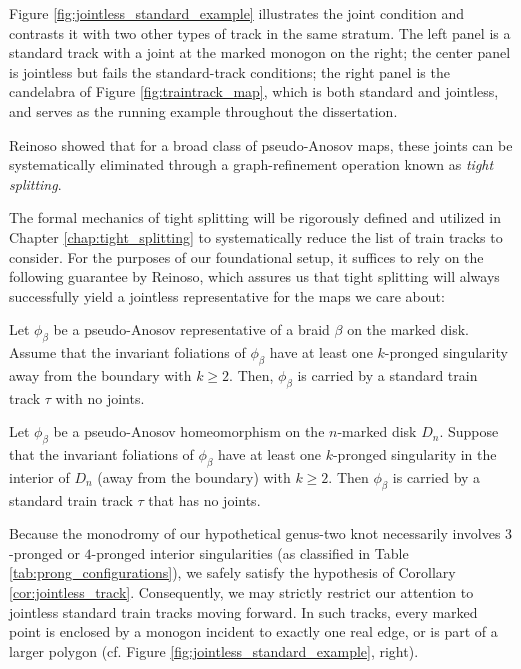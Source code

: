 Figure \ref{fig:jointless_standard_example} illustrates the joint condition and contrasts it with two other types of track in the same stratum. The left panel is a standard track with a joint at the marked monogon on the right; the center panel is jointless but fails the standard-track conditions; the right panel is the candelabra of Figure \ref{fig:traintrack_map}, which is both standard and jointless, and serves as the running example throughout the dissertation.

Reinoso \cite{reinoso2024pseudo} showed that for a broad class of pseudo-Anosov maps, these joints can be systematically eliminated through a graph-refinement operation known as \textit{tight splitting}.

The formal mechanics of tight splitting will be rigorously defined and utilized in Chapter \ref{chap:tight_splitting} to systematically reduce the list of train tracks to consider. For the purposes of our foundational setup, it suffices to rely on the following guarantee by Reinoso, which assures us that tight splitting will always successfully yield a jointless representative for the maps we care about:

\begin{theorem}\label{theorem:theorem C jointless}
Let $\phi_\beta$ be a pseudo-Anosov representative of a braid $\beta$ on the marked disk. Assume that the invariant foliations of $\phi_\beta$ have at least one $k$-pronged singularity away from the boundary with $k \geq 2$. Then, $\phi_\beta$ is carried by a standard train track $\tau$ with no joints.
\end{theorem}

\begin{corollary}
\label{cor:jointless_track}
    Let $\phi_\beta$ be a pseudo-Anosov homeomorphism on the $n$-marked disk $D_n$. Suppose that the invariant foliations of $\phi_\beta$ have at least one $k$-pronged singularity in the interior of $D_n$ (away from the boundary) with $k \geq 2$. Then $\phi_\beta$ is carried by a standard train track $\tau$ that has no joints.
\end{corollary}

Because the monodromy of our hypothetical genus-two knot necessarily involves $3$-pronged or $4$-pronged interior singularities (as classified in Table \ref{tab:prong_configurations}), we safely satisfy the hypothesis of Corollary \ref{cor:jointless_track}. Consequently, we may strictly restrict our attention to jointless standard train tracks moving forward. In such tracks, every marked point is enclosed by a monogon incident to exactly one real edge, or is part of a larger polygon (cf. Figure \ref{fig:jointless_standard_example}, right).

